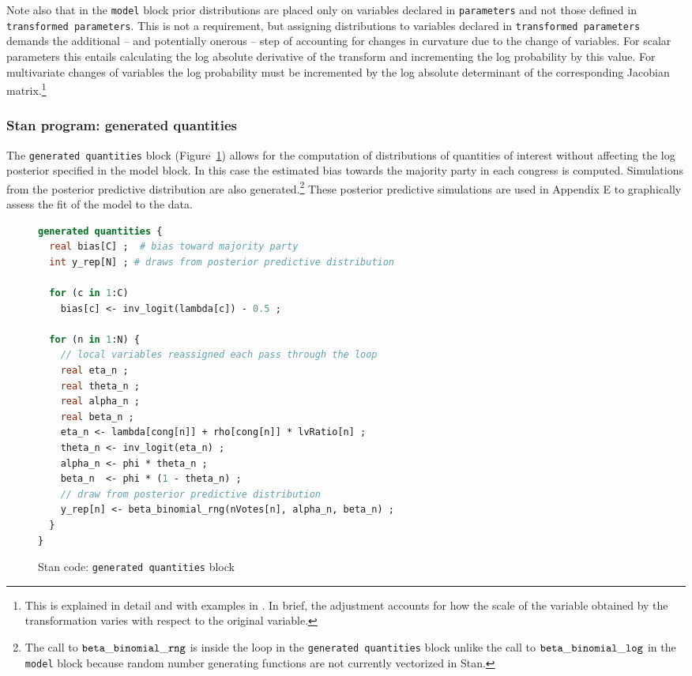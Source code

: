 Note also that in the {\tt model} block prior distributions are placed only on variables declared 
in {\tt parameters}  and not those defined in {\tt transformed parameters}. This is not a requirement, 
but assigning distributions to variables declared in {\tt transformed parameters} demands the 
additional -- and potentially onerous -- step of accounting for changes in curvature due to the 
change of variables. For scalar parameters this entails calculating the log absolute derivative of 
the transform and incrementing the log probability by this value. For multivariate changes of variables 
the log probability must be incremented by the log absolute determinant of the corresponding 
Jacobian matrix.\footnote{This is explained in detail and with examples in 
. In brief, the adjustment accounts for how 
the scale of the variable obtained by the transformation varies with respect to the 
original variable.}



\subsubsection{Stan program: generated quantities}

The {\tt generated quantities} block (Figure~\ref{stan_generated_quantities}) allows for the computation 
of distributions of quantities of interest without affecting the log posterior specified in the model block. 
In this case the estimated bias towards the majority party in each congress is computed. 
Simulations from the posterior predictive distribution 
are also generated.\footnote{The call to ${\tt beta\_binomial\_rng}$ is inside the loop in the 
{\tt generated quantities} block unlike the call to ${\tt beta\_binomial\_log}$ in the {\tt model} block because 
random number generating functions are not currently vectorized in Stan.} These
posterior predictive simulations are used in Appendix E to graphically assess the fit of the 
model to the data. 


\begin{figure}[h]
\begin{lstlisting}[language=Stan, frame=trBL]
generated quantities {
  real bias[C] ;  # bias toward majority party
  int y_rep[N] ; # draws from posterior predictive distribution
  
  for (c in 1:C) 
    bias[c] <- inv_logit(lambda[c]) - 0.5 ;
  
  for (n in 1:N) {
    // local variables reassigned each pass through the loop
    real eta_n ;
    real theta_n ;
    real alpha_n ;
    real beta_n ;
    eta_n <- lambda[cong[n]] + rho[cong[n]] * lvRatio[n] ;
    theta_n <- inv_logit(eta_n) ;    
    alpha_n <- phi * theta_n ;
    beta_n  <- phi * (1 - theta_n) ;
    // draw from posterior predictive distribution
    y_rep[n] <- beta_binomial_rng(nVotes[n], alpha_n, beta_n) ;
  }
}
\end{lstlisting}
\caption{Stan code: {\tt generated quantities} block}
\label{stan_generated_quantities}
\end{figure}

\clearpage

